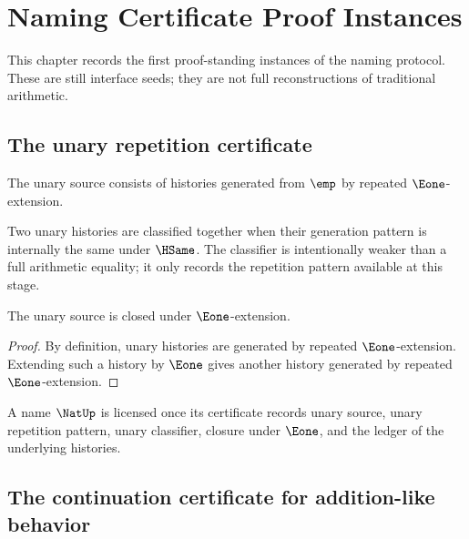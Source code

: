 
\chapter{Naming Certificate Proof Instances}
\label{ch:proof-standing-namecert-proof-instances}

This chapter records the first proof-standing instances of the naming protocol. These are still interface seeds; they are not full reconstructions of traditional arithmetic.

\section{The unary repetition certificate}

\begin{definition}
The unary source consists of histories generated from \(\emp\) by repeated \(\Eone\)-extension.
\end{definition}

\begin{definition}
Two unary histories are classified together when their generation pattern is internally the same under \(\HSame\). The classifier is intentionally weaker than a full arithmetic equality; it only records the repetition pattern available at this stage.
\end{definition}

\begin{theorem}
\label{thm:unary-repetition-closure}
The unary source is closed under \(\Eone\)-extension.
\end{theorem}
\begin{proof}
By definition, unary histories are generated by repeated \(\Eone\)-extension. Extending such a history by \(\Eone\) gives another history generated by repeated \(\Eone\)-extension.
\end{proof}

\begin{corollary}
A name \(\NatUp\) is licensed once its certificate records unary source, unary repetition pattern, unary classifier, closure under \(\Eone\), and the ledger of the underlying histories.
\end{corollary}

\section{The continuation certificate for addition-like behavior}


